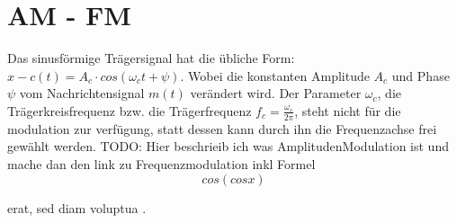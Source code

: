 %
%
%
\section{AM - FM\label{fm:section:teil0}}

Das sinusförmige Trägersignal hat die übliche Form: 
\(x-c(t) = A_c \cdot cos(\omega_ct+\psi)\).
Wobei die konstanten Amplitude \(A_c\) und Phase \(\psi\) vom Nachrichtensignal \(m(t)\) verändert wird.
Der Parameter \(\omega_c\), die Trägerkreisfrequenz bzw. die Trägerfrequenz \(f_c = \frac{\omega_c}{2\pi}\),
steht nicht für die modulation zur verfügung, statt dessen kann durch ihn die Frequenzachse frei gewählt werden.
\newblockpunct
TODO:
Hier beschrieib ich was AmplitudenModulation ist und mache dan den link zu Frequenzmodulation inkl Formel \[cos( cos x)\]



erat, sed diam voluptua \cite{fm:bibtex}.


